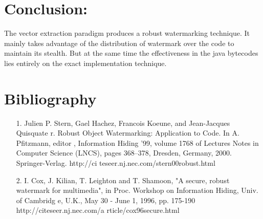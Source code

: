\section{Conclusion: } 
The vector extraction paradigm produces a robust watermarking technique. It mainly
takes advantage of the distribution of watermark over the code to maintain its 
stealth. But at the same time the effectiveness in the java bytecodes lies 
entirely on the exact implementation technique. 

\section{Bibliography}
\begin{itemize}
\item [1.]
Julien P. Stern, Gael Hachez, Francois Koeune, and Jean-Jacques\\ Quisquate
r. Robust Object Watermarking: Application to Code. In A. Pfitzmann, editor
, Information Hiding '99, volume 1768 of Lectures Notes in Computer Science
 (LNCS), pages 368--378, Dresden, Germany, 2000. Springer-Verlag. http://ci
teseer.nj.nec.com/stern00robust.html
\item [2.]
I. Cox, J. Kilian, T. Leighton and T. Shamoon, "A secure, robust watermark
for multimedia", in Proc. Workshop on Information Hiding, Univ. of Cambridg
e, U.K., May 30 - June 1, 1996, pp. 175-190 \\ http://citeseer.nj.nec.com/a
rticle/cox96secure.html
\end{itemize}

